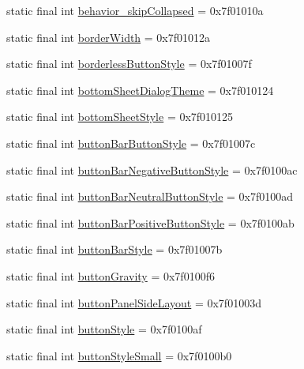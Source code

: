 \begin{CompactItemize}
static final int \hyperlink{classandroid_1_1support_1_1v4_1_1_r_1_1attr_5545df3de384583d10ba6222a0ad873b}{behavior\_\-skipCollapsed} = 0x7f01010a
\item 
static final int \hyperlink{classandroid_1_1support_1_1v4_1_1_r_1_1attr_3c18c05be92e6c88eb90139155411f3d}{borderWidth} = 0x7f01012a
\item 
static final int \hyperlink{classandroid_1_1support_1_1v4_1_1_r_1_1attr_096be99e2a43d9ce76a8a420c1dd3d68}{borderlessButtonStyle} = 0x7f01007f
\item 
static final int \hyperlink{classandroid_1_1support_1_1v4_1_1_r_1_1attr_323be274dced1d9cfd3e0aeddccb214e}{bottomSheetDialogTheme} = 0x7f010124
\item 
static final int \hyperlink{classandroid_1_1support_1_1v4_1_1_r_1_1attr_aa2356a76198f3735f538e9e0f541812}{bottomSheetStyle} = 0x7f010125
\item 
static final int \hyperlink{classandroid_1_1support_1_1v4_1_1_r_1_1attr_a9fd2c551e9547c46944788729311b1f}{buttonBarButtonStyle} = 0x7f01007c
\item 
static final int \hyperlink{classandroid_1_1support_1_1v4_1_1_r_1_1attr_0dacd501b4161f347a9010901c3de029}{buttonBarNegativeButtonStyle} = 0x7f0100ac
\item 
static final int \hyperlink{classandroid_1_1support_1_1v4_1_1_r_1_1attr_6ec20072a693edb0660ad4cc64c65dbe}{buttonBarNeutralButtonStyle} = 0x7f0100ad
\item 
static final int \hyperlink{classandroid_1_1support_1_1v4_1_1_r_1_1attr_a4379082fd003f1146261778f06ef298}{buttonBarPositiveButtonStyle} = 0x7f0100ab
\item 
static final int \hyperlink{classandroid_1_1support_1_1v4_1_1_r_1_1attr_84d7b49e0aa74005f7e21f3b03838a8c}{buttonBarStyle} = 0x7f01007b
\item 
static final int \hyperlink{classandroid_1_1support_1_1v4_1_1_r_1_1attr_f23b93746c54f05a9ebfb9036d9f02b6}{buttonGravity} = 0x7f0100f6
\item 
static final int \hyperlink{classandroid_1_1support_1_1v4_1_1_r_1_1attr_aecddbe1934bae0fb271e5b463621db9}{buttonPanelSideLayout} = 0x7f01003d
\item 
static final int \hyperlink{classandroid_1_1support_1_1v4_1_1_r_1_1attr_3755dc03810850792c95e1a1e53e339c}{buttonStyle} = 0x7f0100af
\item 
static final int \hyperlink{classandroid_1_1support_1_1v4_1_1_r_1_1attr_a4fc8f9ca45fb006e8c99b766021f444}{buttonStyleSmall} = 0x7f0100b0
\item 

\end{CompactItemize}
